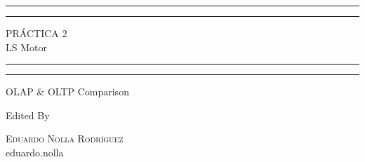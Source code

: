 \begin{titlepage} %

	\centering %
	
	\scshape %
	
	\vspace*{\baselineskip} %
	
	
	\rule{\textwidth}{1.6pt}\vspace*{-\baselineskip}\vspace*{2pt} %
	\rule{\textwidth}{0.4pt} %
	
	\vspace{0.75\baselineskip} %
	
	{\LARGE PRÁCTICA 2\\ LS Motor\\} %
	
	\vspace{0.75\baselineskip} %
	
	\rule{\textwidth}{0.4pt}\vspace*{-\baselineskip}\vspace{3.2pt} %
	\rule{\textwidth}{1.6pt} %
	
	\vspace{2\baselineskip} %
	
	
	OLAP \& OLTP Comparison	
	\vspace*{3\baselineskip} %
	
	
	Edited By
	
	\vspace{0.5\baselineskip} %
	
	{\scshape\Large Eduardo Nolla Rodríguez\\} %
	\textnormal {eduardo.nolla}
	
	\vspace{1.0\baselineskip} %
	

\end{titlepage}

